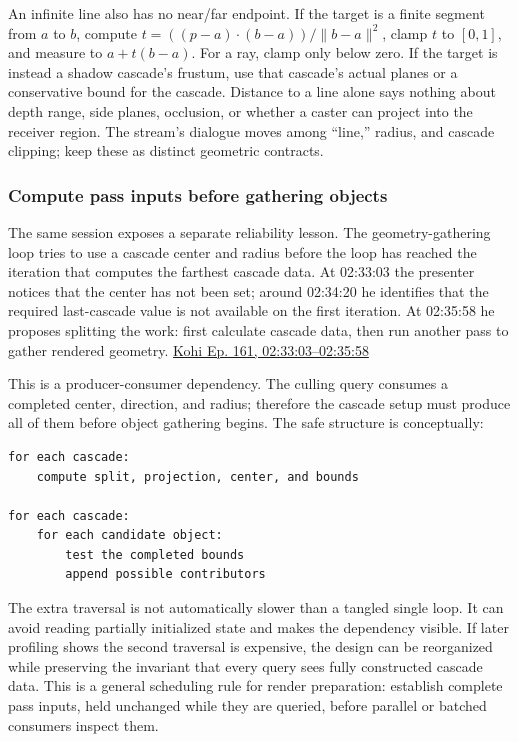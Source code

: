 An infinite line also has no near/far endpoint. If the target is a finite segment from \(a\) to \(b\), compute \(t=((p-a)\cdot(b-a))/\|b-a\|^2\), clamp \(t\) to \([0,1]\), and measure to \(a+t(b-a)\). For a ray, clamp only below zero. If the target is instead a shadow cascade's frustum, use that cascade's actual planes or a conservative bound for the cascade. Distance to a line alone says nothing about depth range, side planes, occlusion, or whether a caster can project into the receiver region. The stream's dialogue moves among ``line,'' radius, and cascade clipping; keep these as distinct geometric contracts.

\subsubsection{Compute pass inputs before gathering objects}\label{04-visual-computing-ii-ch028-compute-pass-inputs-before-gathering-objects}

The same session exposes a separate reliability lesson. The geometry-gathering loop tries to use a cascade center and radius before the loop has reached the iteration that computes the farthest cascade data. At 02:33:03 the presenter notices that the center has not been set; around 02:34:20 he identifies that the required last-cascade value is not available on the first iteration. At 02:35:58 he proposes splitting the work: first calculate cascade data, then run another pass to gather rendered geometry. \href{https://www.youtube.com/watch?v=dJYWL9YAelY&t=9183s}{Kohi Ep. 161, 02:33:03--02:35:58}

This is a producer-consumer dependency. The culling query consumes a completed center, direction, and radius; therefore the cascade setup must produce all of them before object gathering begins. The safe structure is conceptually:

\begin{verbatim}
for each cascade:
    compute split, projection, center, and bounds

for each cascade:
    for each candidate object:
        test the completed bounds
        append possible contributors
\end{verbatim}

The extra traversal is not automatically slower than a tangled single loop. It can avoid reading partially initialized state and makes the dependency visible. If later profiling shows the second traversal is expensive, the design can be reorganized while preserving the invariant that every query sees fully constructed cascade data. This is a general scheduling rule for render preparation: establish complete pass inputs, held unchanged while they are queried, before parallel or batched consumers inspect them.


